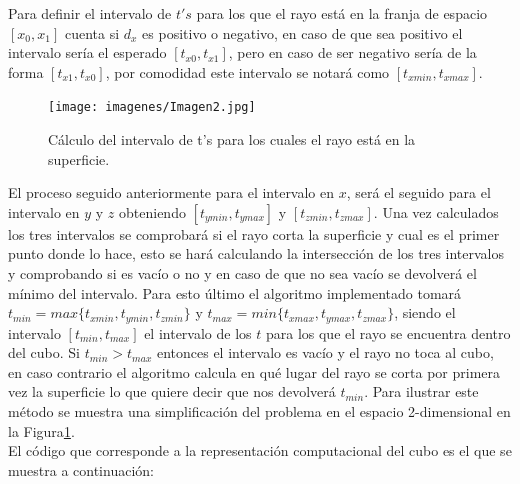 Para definir el intervalo de $t's$ para los que el rayo está en la franja de espacio $[x_0, x_1]$ cuenta si $d_x$ es positivo o negativo, en caso de que sea positivo el intervalo sería el esperado $[t_{x0}, t_{x1}]$, pero en caso de ser negativo sería de la forma $[t_{x1}, t_{x0}]$, por comodidad este intervalo se notará como $[t_{x min}, t_{x max}]$.
	${ }$\\	
\begin{figure}
	\begin{center}
		\texttt{[image: imagenes/Imagen2.jpg]}
	\end{center}
	\caption{Cálculo del intervalo de t's para los cuales el rayo está en la superficie.}
	\label{fig:etiq_4}
\end{figure}




El proceso seguido anteriormente para el intervalo en $x$, será el seguido para el intervalo en $y$ y $z$ obteniendo $[t_{y min}, t_{y max}]$ y $[t_{z min}, t_{z max}]$. Una vez calculados los tres intervalos se comprobará si el rayo corta la superficie y cual es el primer punto donde lo hace, esto se hará calculando la intersección de los tres intervalos y comprobando si es vacío o no y en caso de que no sea vacío se devolverá el mínimo del intervalo. Para esto último el algoritmo implementado tomará $t_{min} = max\{t_{x min}, t_{y min}, t_{z min}\}$ y $t_{max} = min\{t_{x max}, t_{y max}, t_{z max}\}$, siendo el intervalo $[t_{min}, t_{max}]$ el intervalo de los $t$ para los que el rayo se encuentra dentro del cubo. Si $t_{min} > t_{max}$ entonces el intervalo es vacío y el rayo no toca al cubo, en caso contrario el algoritmo calcula en qué lugar del rayo se corta por primera vez la superficie lo que quiere decir que nos devolverá $t_{min}$. Para ilustrar este método se muestra una simplificación del problema en el espacio 2-dimensional en la Figura\ref{fig:etiq_4}.
	${ }$\\	



El código que corresponde a la representación computacional del cubo es el que se muestra a continuación:
${ }$\\

